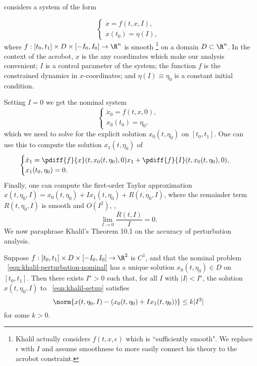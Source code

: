 \citet{khalil_nonlinear} considers a system of the form

\begin{equation}\label{eqn:khalil-setup}
    \begin{cases}
        \dot{x} = f(t,x,I), \\
        x(t_0) = \eta(I),
    \end{cases}
\end{equation}
where 
\(f : [t_0,t_1] \times D \times [-I_0,I_0] \rightarrow \R^n\) is smooth 
\footnote{Khalil actually considers \(f(t,x,\epsilon)\) which is ``sufficiently
    smooth". We replace \(\epsilon\) with \(I\) and assume smoothness to
    more easily connect his theory to the acrobot constraint.}
on a domain \(D \subset \R^n\).
In the context of the acrobot, \(x\) is the any coordinates which make
our analysis convenient;
\(I\) is a control parameter of the system;
the function \(f\) is the constrained dynamics in \(x\)-coordinates;
and \(\eta(I) \equiv \eta_0\) is a constant initial condition.

Setting \(I = 0\) we get the nominal system
\begin{equation}\label{eqn:khalil-perturbation-nominal}
    \begin{cases}
        \dot{x}_0 = f(t,x,0) ,\\
        x_0(t_0) = \eta_0 ,
    \end{cases}
\end{equation}
which we need to solve for the explicit solution \(x_0(t,\eta_0)\) on \([t_0,t_1]\).
One can use this to compute the solution \(x_1(t,\eta_0)\) of
\begin{equation}\label{eqn:khalil-perturbation-firstorder}
    \begin{cases}
        \dot{x}_1 = \pdiff{f}{x}(t,x_0(t,\eta_0),0)x_1 + \pdiff{f}{I}(t,x_0(t,\eta_0),0)
        , \\
        x_1(t_0,\eta_0) = 0
        .
    \end{cases}
\end{equation}
Finally, one can compute the first-order Taylor approximation
\(x(t,\eta_0,I) = x_0(t,\eta_0) + I x_1(t,\eta_0) + R(t,\eta_0,I)\), where the remainder
term \(R(t,\eta_0,I)\) is smooth and \(O(I^2)\), \ie,
\[
    \lim \limits_{I \to 0} \frac{R(t,I)}{I} = 0
    .
\]
We now paraphrase Khalil's Theorem 10.1 \cite{khalil_nonlinear} on the
accuracy of perturbation analysis.
\begin{thm}\label{thm:khalil-perturbation}
    Suppose \(f : [t_0,t_1] \times D \times [-I_0,I_0] \rightarrow \R^2\) is
    \(C^1\), and that the nominal problem ~\eqref{eqn:khalil-perturbation-nominal} has a
    unique solution \(x_0(t,\eta_0) \in D\) on \([t_0,t_1]\).
    Then there exists \(I^\star > 0\) such that, for all \(I\) with \(|I| < I^\star\), the
    solution \(x(t,\eta_0,I)\) to ~\eqref{eqn:khalil-setup} satisfies
    \[
        \norm{x(t,\eta_0,I) - \left(x_0(t,\eta_0) + I x_1(t,\eta_0)\right)} \leq k |I^2|
    \]
    for some \(k > 0\).
\end{thm}

